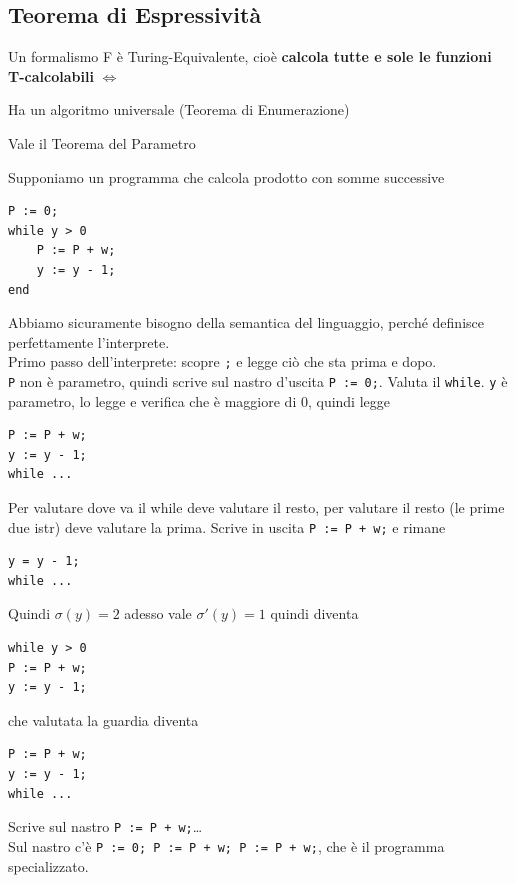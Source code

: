 \documentclass[10pt]{book}
\begin{document}
\subsection{Teorema di Espressività}
Un formalismo F è Turing-Equivalente, cioè \textbf{calcola tutte e sole le funzioni T-calcolabili} $\Leftrightarrow$ 
\begin{list}{-}{}
	\item Ha un algoritmo universale (Teorema di Enumerazione)
	\item Vale il Teorema del Parametro
\end{list}
\pagebreak
Supponiamo un programma che calcola prodotto con somme successive
\begin{verbatim}
P := 0;
while y > 0
	P := P + w;
	y := y - 1;
end
\end{verbatim}
Abbiamo sicuramente bisogno della semantica del linguaggio, perché definisce perfettamente l'interprete.\\
Primo passo dell'interprete: scopre \texttt{;} e legge ciò che sta prima e dopo.\\
\texttt{P} non è parametro, quindi scrive sul nastro d'uscita \texttt{P := 0;}. Valuta il \texttt{while}. \texttt{y} è parametro, lo legge e verifica che è maggiore di 0, quindi legge
\begin{verbatim}
P := P + w;
y := y - 1;
while ...
\end{verbatim}
Per valutare dove va il while deve valutare il resto, per valutare il resto (le prime due istr) deve valutare la prima. Scrive in uscita \texttt{P := P + w;} e rimane
\begin{verbatim}
y = y - 1;
while ...
\end{verbatim}
Quindi $\sigma(y) = 2$ adesso vale $\sigma'(y) = 1$ quindi diventa
\begin{verbatim}
while y > 0
P := P + w;
y := y - 1;
\end{verbatim}
che valutata la guardia diventa
\begin{verbatim}
P := P + w;
y := y - 1;
while ...
\end{verbatim}
Scrive sul nastro \texttt{P := P + w;}\ldots\\
Sul nastro c'è \texttt{P := 0; P := P + w; P := P + w;}, che è il programma specializzato.
\end{document}

